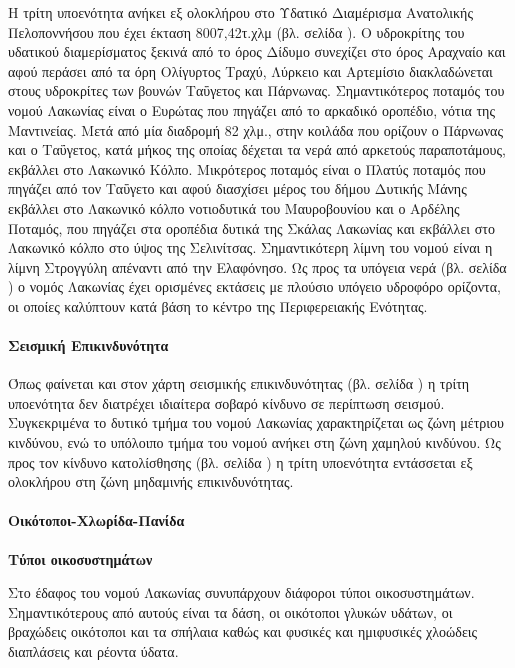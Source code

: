 \documentclass[12pt]{article}
\begin{document}
	Η τρίτη υποενότητα ανήκει εξ ολοκλήρου στο Υδατικό Διαμέρισμα Ανατολικής Πελοποννήσου που έχει έκταση 8007,42τ.χλμ (βλ. σελίδα \pageref{ydatika}). Ο υδροκρίτης του υδατικού διαμερίσματος ξεκινά από το όρος Δίδυμο συνεχίζει στο όρος Αραχναίο και αφού περάσει από τα όρη Ολίγυρτος Τραχύ, Λύρκειο και Αρτεμίσιο διακλαδώνεται στους υδροκρίτες των βουνών Ταΰγετος και Πάρνωνας. Σημαντικότερος ποταμός του νομού Λακωνίας είναι ο Ευρώτας που πηγάζει από το αρκαδικό οροπέδιο, νότια της Μαντινείας. Μετά από μία διαδρομή 82 χλμ., στην κοιλάδα που ορίζουν ο Πάρνωνας και ο Ταΰγετος, κατά μήκος της οποίας δέχεται τα νερά από αρκετούς παραποτάμους, εκβάλλει στο Λακωνικό Κόλπο. Μικρότερος ποταμός είναι ο Πλατύς ποταμός που πηγάζει από τον Ταΰγετο και αφού διασχίσει μέρος του δήμου Δυτικής Μάνης εκβάλλει στο Λακωνικό κόλπο νοτιοδυτικά του Μαυροβουνίου και ο Αρδέλης Ποταμός, που πηγάζει στα οροπέδια δυτικά της Σκάλας Λακωνίας και εκβάλλει στο Λακωνικό κόλπο στο ύψος της Σελινίτσας. Σημαντικότερη λίμνη του νομού είναι η λίμνη Στρογγύλη απέναντι από την Ελαφόνησο. Ως προς τα υπόγεια νερά (βλ. σελίδα \pageref{ypogeia}) ο νομός Λακωνίας έχει ορισμένες εκτάσεις με πλούσιο υπόγειο υδροφόρο ορίζοντα, οι οποίες καλύπτουν κατά βάση το κέντρο της Περιφερειακής Ενότητας.
	
	\paragraph{Σεισμική Επικινδυνότητα}
	
	Όπως φαίνεται και στον χάρτη σεισμικής επικινδυνότητας (βλ. σελίδα \pageref{seismiki}) η τρίτη υποενότητα δεν διατρέχει ιδιαίτερα σοβαρό κίνδυνο σε περίπτωση σεισμού. Συγκεκριμένα το δυτικό τμήμα του νομού Λακωνίας χαρακτηρίζεται  ως ζώνη μέτριου κινδύνου, ενώ το υπόλοιπο τμήμα του νομού ανήκει στη ζώνη χαμηλού κινδύνου. Ως προς τον κίνδυνο κατολίσθησης (βλ. σελίδα \pageref{katolisthiseis}) η τρίτη υποενότητα εντάσσεται εξ ολοκλήρου στη ζώνη μηδαμινής επικινδυνότητας.
	
	\paragraph{Οικότοποι-Χλωρίδα-Πανίδα}
	
	\textbf{Τύποι οικοσυστημάτων}
	
	Στο έδαφος του νομού Λακωνίας συνυπάρχουν διάφοροι τύποι οικοσυστημάτων. Σημαντικότερους από αυτούς είναι τα δάση, οι οικότοποι γλυκών υδάτων, οι βραχώδεις οικότοποι και τα σπήλαια καθώς και φυσικές και ημιφυσικές χλοώδεις διαπλάσεις και ρέοντα ύδατα.
	
\end{document}
